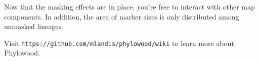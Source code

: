 Now that the masking effects are in place, you're free to interact with other map components.
In addition, the area of marker sizes is only distributed among unmasked lineages.

Visit \texttt{https://github.com/mlandis/phylowood/wiki} to learn more about Phylowood.






